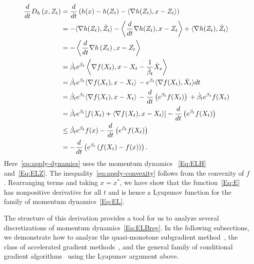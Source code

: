 \documentclass[11pt]{article}
\theoremstyle{plain}
\begin{document}
\begin{subequations}\label{Eq:LyapAnal}
\begin{align}
 \frac{d}{dt}D_h\left(x, Z_t\right)  &= \frac{d}{dt}\left( h(x) - h(Z_t) - \langle \nabla h(Z_t), x- Z_t\rangle\right)  \notag\\
& = - \langle \nabla h(Z_t), \dot Z_t\rangle -\left\langle \frac{d}{dt} \nabla h(Z_t),x - Z_t\right\rangle  + \langle \nabla h(Z_t), \dot Z_t\rangle \notag\\ 
 &= -\left\langle \frac{d}{dt} \nabla h\left(Z_t\right), x - Z_t\right\rangle \, \notag\\%
&=   \dot \beta_t e^{\beta_t}\left\langle\nabla f(X_t), x  - X_{t} - \frac{1}{\dot \beta_t} \dot X_{s} \right\rangle  \, \label{eq:apply-dynamics}   \\
& =   \dot \beta_t e^{\beta_t} \langle \nabla f(X_t), x - X_t \rangle\, - e^{ \beta_t} \langle \nabla f(X_t), \dot X_t\rangle dt\, \notag   \\
& = \dot \beta_t e^{\beta_t} \langle \nabla f(X_t), x - X_t \rangle\,  -   \frac{d}{dt}\left(e^{ \beta_t} f(X_t)\right)\,   + \dot \beta_t e^{\beta_t}  f(X_t)  \notag\\
&= \dot \beta_t e^{\beta_t} [f(X_t)+ \langle \nabla f(X_t), x - X_t \rangle] -\frac{d}{dt}\left(e^{ \beta_t} f(X_t)\right)\,  \notag  \\ %
& \leq  \dot \beta_t e^{\beta_t}f(x) - \frac{d}{dt}\left(e^{ \beta_t} f(X_t)\right)\, \label{eq:apply-convexity}\\
& = - \frac{d}{dt} \left(e^{\beta_t}\left(f(X_t) - f(x)\right)\right) \label{Eq:cond1}.
\end{align}
\end{subequations}
Here~\eqref{eq:apply-dynamics} uses the momentum dynamics%
~\eqref{Eq:ELH} and~\eqref{Eq:ELZ}. 
The inequality~\eqref{eq:apply-convexity} follows from the convexity of $f$. Rearranging terms and taking $x = x^\ast$, we have show that the function~\eqref{Eq:E} has nonpositive derivative for all $t$ and is hence a Lyapunov function for the family of momentum dynamics~\eqref{Eq:EL}.

 The structure of this derivation provides a tool for us to analyze several discretizations of momentum dynamics~\eqref{Eq:ELBreg}.
 In the following subsections, we demonstrate how to analyze the quasi-monotone subgradient method~\cite{Nesterov15}, the class of accelerated gradient methods~\cite{Baes09,Acceleration}, and the general family of conditional gradient algorithms~\cite{NesterovCond15} using the Lyapunov argument above.
\end{document}
